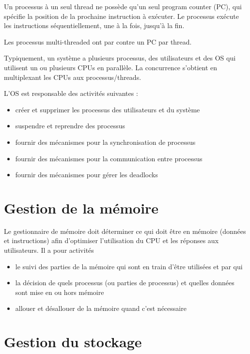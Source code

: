 		Un processus à un seul thread ne possède qu'un seul program counter (PC), qui spécifie la position de la prochaine instruction à exécuter. Le processus exécute les instructions séquentiellement, une à la fois, jusqu'à la fin.
		
		Les processus multi-threaded ont par contre un PC par thread.
		
		Typiquement, un système a plusieurs processus, des utilisateurs et des OS qui utilisent un ou plusieurs CPUs en parallèle. La concurrence s'obtient en multiplexant les CPUs aux processus/threads.
		
		L'OS est responsable des activités suivantes :
		
		\begin{itemize}
			\item créer et supprimer les processus des utilisateurs et du système
			\item suspendre et reprendre des processus
			\item fournir des mécanismes pour la synchronisation de processus
			\item fournir des mécanismes pour la communication entre processus
			\item fournir des mécanismes pour gérer les deadlocks
		\end{itemize}
		
\section{Gestion de la mémoire}

Le gestionnaire de mémoire doit déterminer ce qui doit être en mémoire (données et instructions) afin d'optimiser l'utilisation du CPU et les réponses aux utilisateurs. Il a pour activités

\begin{itemize}
	\item le suivi des parties de la mémoire qui sont en train d'être utilisées et par qui
	\item la décision de quels processus (ou parties de processus) et quelles données sont mise en ou hors mémoire
	\item allouer et désallouer de la mémoire quand c'est nécessaire
\end{itemize}

\section{Gestion du stockage}

